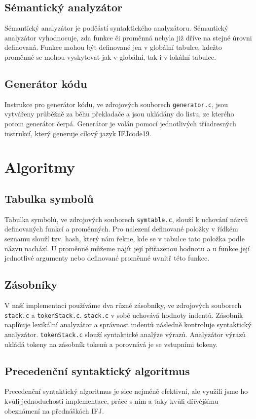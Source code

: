 \documentclass[a4paper, 11pt]{article}
\begin{document}
\subsection{Sémantický analyzátor}
Sémantický analyzátor je podčástí syntaktického analyzátoru. Sémantický analyzátor vyhodnocuje, zda funkce či proměnná nebyla již dříve na stejné úrovni definovaná. Funkce mohou být definované jen v globální tabulce, kdežto proměnné se mohou vyskytovat jak v globální, tak i v lokální tabulce.

\subsection{Generátor kódu}
Instrukce pro generátor kódu, ve zdrojových souborech \verb|generator.c|, jsou vytvářeny průběžně za běhu překladače a jsou ukládány do listu, ze kterého potom generátor čerpá. Generátor je volán pomocí jednotlivých tříadresných instrukcí, který generuje cílový jazyk IFJcode19.


\section{Algoritmy}

\subsection{Tabulka symbolů}
Tabulka symbolů, ve zdrojových souborech \verb|symtable.c|, slouží k uchování názvů definovaných funkcí a proměnných. Pro nalezení definované položky v řídkém seznamu slouží tzv. hash, který nám řekne, kde se v tabulce tato položka podle názvu nachází. U proměnné můžeme najít její přiřazenou hodnotu a u funkce její jednotlivé argumenty nebo definované proměnné uvnitř této funkce.

\subsection{Zásobníky}
V naší implementaci používáme dva různé zásobníky, ve zdrojových souborech \verb|stack.c| a \verb|tokenStack.c|. \verb|stack.c| v sobě uchovává hodnoty indentů. Zásobník naplňuje lexikální analyzátor a správnost indentů následně kontroluje syntaktický analyzátor. \verb|tokenStack.c| slouží syntaktické analýze výrazů. Analyzátor výrazů ukládá tokeny na zásobník tokenů a porovnává je se vstupními tokeny.

\subsection{Precedenční syntaktický algoritmus}
Precedenční syntaktický algoritmus je sice nejméně efektivní, ale využili jsme ho kvůli jednoduchosti implementace, práce s ním a taky kvůli dřívějšímu obeznámení na přednáškách IFJ.
\end{document}
